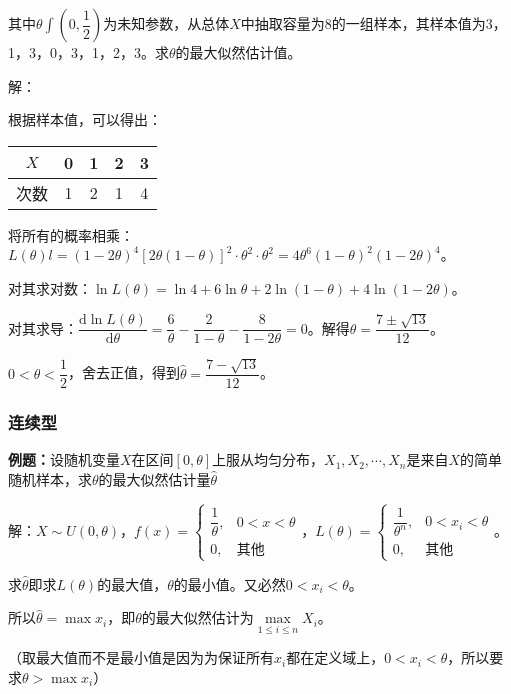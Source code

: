 其中$\theta\int\left(0,\dfrac{1}{2}\right)$为未知参数，从总体$X$中抽取容量为8的一组样本，其样本值为3，1，3，0，3，1，2，3。求$\theta$的最大似然估计值。

解：

根据样本值，可以得出：\medskip

\begin{tabular}{c|cccc}
    \hline
    $X$ & 0 & 1 & 2 & 3 \\ \hline
    次数 & 1 & 2 & 1 & 4 \\ \hline
\end{tabular} \medskip

将所有的概率相乘：$L(\theta)l=(1-2\theta)^4[2\theta(1-\theta)]^2\cdot\theta^2\cdot\theta^2=4\theta^6(1-\theta)^2(1-2\theta)^4$。

对其求对数：$\ln L(\theta)=\ln4+6\ln\theta+2\ln(1-\theta)+4\ln(1-2\theta)$。

对其求导：$\dfrac{\textrm{d}\ln L(\theta)}{\textrm{d}\theta}=\dfrac{6}{\theta}-\dfrac{2}{1-\theta}-\dfrac{8}{1-2\theta}=0$。解得$\theta=\dfrac{7\pm\sqrt{13}}{12}$。

$0<\theta<\dfrac{1}{2}$，舍去正值，得到$\hat{\theta}=\dfrac{7-\sqrt{13}}{12}$。

\subsubsection{连续型}

\textbf{例题：}设随机变量$X$在区间$[0,\theta]$上服从均匀分布，$X_1,X_2,\cdots,X_n$是来自$X$的简单随机样本，求$\theta$的最大似然估计量$\hat{\theta}$

解：$X\sim U(0,\theta)$，$f(x)=\left\{\begin{array}{ll}
    \dfrac{1}{\theta}, & 0<x<\theta \\
    0, & \text{其他}
\end{array}\right.$，$L(\theta)=\left\{\begin{array}{ll}
    \dfrac{1}{\theta^n}, & 0<x_i<\theta \\
    0, & \text{其他}
\end{array}\right.$。

求$\hat{\theta}$即求$L(\theta)$的最大值，$\theta$的最小值。又必然$0<x_i<\theta$。

所以$\hat{\theta}=\max x_i$，即$\theta$的最大似然估计为$\max\limits_{1\leqslant i\leqslant n}X_i$。

（取最大值而不是最小值是因为为保证所有$x_i$都在定义域上，$0<x_i<\theta$，所以要求$\theta>\max x_i$）

